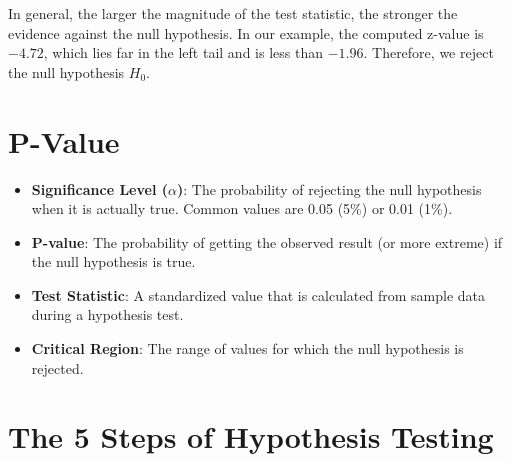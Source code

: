 \documentclass[twoside]{book}
\begin{document}
In general, the larger the magnitude of the test statistic, the stronger the evidence against the null hypothesis. In our example, the computed z-value is $-4.72$, which lies far in the left tail and is less than $-1.96$. Therefore, we reject the null hypothesis $H_0$.



\section{P-Value}

\begin{itemize}
    \item \textbf{Significance Level (\( \alpha \))}: The probability of rejecting the null hypothesis when it is actually true. Common values are 0.05 (5\%) or 0.01 (1\%).
    \item \textbf{P-value}: The probability of getting the observed result (or more extreme) if the null hypothesis is true.
    \item \textbf{Test Statistic}: A standardized value that is calculated from sample data during a hypothesis test.
    \item \textbf{Critical Region}: The range of values for which the null hypothesis is rejected.
\end{itemize}

\section{The 5 Steps of Hypothesis Testing}
\end{document}
